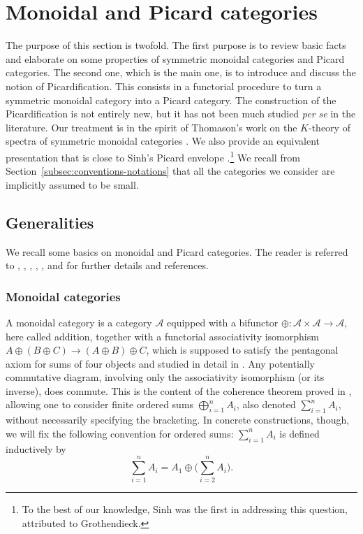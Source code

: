 \documentclass[11pt]{article}
\theoremstyle{plain}
\theoremstyle{definition}
\newcommand{\Acal}{\mathcal A}
\begin{document}
\section{Monoidal and Picard categories}\label{sec:monoidal-picard}
The purpose of this section is twofold. The first purpose is to review basic facts and elaborate on some properties of symmetric monoidal categories and Picard categories. The second one, which is the main one, is to introduce and discuss the notion of Picardification. This consists in a functorial procedure to turn a symmetric monoidal category into a Picard category. The construction of the Picardification is not entirely new, but it has not been much studied \emph{per se} in the literature. Our treatment is in the spirit of Thomason's work on the $K$-theory of spectra of symmetric monoidal categories \cite{ThomasonSpectral}. We also provide an equivalent presentation that is close to Sinh's Picard envelope \cite{Sinh-these}.\footnote{To the best of our knowledge, Sinh was the first in addressing this question, attributed to Grothendieck.} We recall from Section~\ref{subsec:conventions-notations} that all the categories we consider are implicitly assumed to be small.

\subsection{Generalities}
We recall some basics on monoidal and Picard categories. The reader is referred to \cite[\S 4]{Deligne-determinant}, \cite[App.\,A]{KnudsenMumford}, \cite{MacLane}, \cite{Richter}, \cite{Saavedra}, and \cite{Sinh-these} for further details and references.

\subsubsection{Monoidal categories}\label{subsub:monoidalcategories}
A monoidal category is a category $\Acal$ equipped with a bifunctor $\oplus: \Acal \times \Acal \to \Acal$, here called addition, together with a functorial associativity isomorphism $A\oplus (B \oplus C) \to (A \oplus B) \oplus C$, which is supposed to satisfy the pentagonal axiom for sums of four objects and studied in detail in \cite[p.\,33]{MacLane}. Any potentially commutative diagram, involving only the associativity isomorphism (or its inverse), does commute. This is the content of the coherence theorem proved in \cite[Th.\,3.1]{MacLane}, allowing one to consider finite ordered sums $\bigoplus_{i=1}^{n} A_i$, also denoted $\sum_{i=1}^{n} A_{i}$, without necessarily specifying the bracketing. In concrete constructions, though, we will fix the following convention for ordered sums: $\sum_{i=1}^{n}A_{i}$ is defined inductively by
\begin{equation}\label{eq:convention-sum}
\sum_{i=1}^{n}A_{i}=A_{1}\oplus \biggl(\sum_{i=2}^{n}A_{i}\biggr).
\end{equation}
\end{document}
